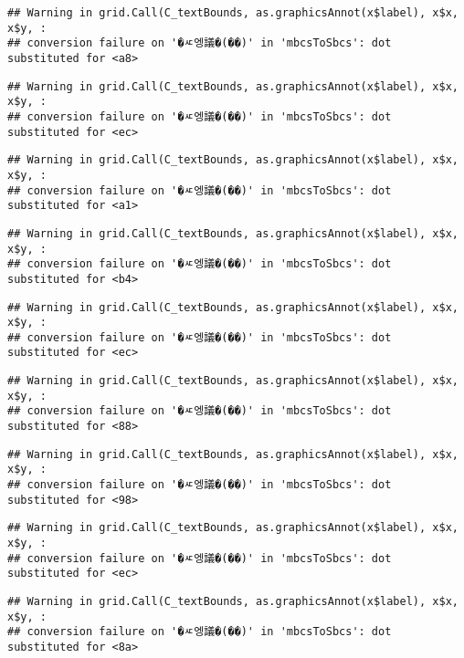 \documentclass[
]{article}
\begin{document}
\begin{verbatim}
## Warning in grid.Call(C_textBounds, as.graphicsAnnot(x$label), x$x, x$y, :
## conversion failure on '�ㅼ엥議�(��)' in 'mbcsToSbcs': dot substituted for <a8>
\end{verbatim}

\begin{verbatim}
## Warning in grid.Call(C_textBounds, as.graphicsAnnot(x$label), x$x, x$y, :
## conversion failure on '�ㅼ엥議�(��)' in 'mbcsToSbcs': dot substituted for <ec>
\end{verbatim}

\begin{verbatim}
## Warning in grid.Call(C_textBounds, as.graphicsAnnot(x$label), x$x, x$y, :
## conversion failure on '�ㅼ엥議�(��)' in 'mbcsToSbcs': dot substituted for <a1>
\end{verbatim}

\begin{verbatim}
## Warning in grid.Call(C_textBounds, as.graphicsAnnot(x$label), x$x, x$y, :
## conversion failure on '�ㅼ엥議�(��)' in 'mbcsToSbcs': dot substituted for <b4>
\end{verbatim}

\begin{verbatim}
## Warning in grid.Call(C_textBounds, as.graphicsAnnot(x$label), x$x, x$y, :
## conversion failure on '�ㅼ엥議�(��)' in 'mbcsToSbcs': dot substituted for <ec>
\end{verbatim}

\begin{verbatim}
## Warning in grid.Call(C_textBounds, as.graphicsAnnot(x$label), x$x, x$y, :
## conversion failure on '�ㅼ엥議�(��)' in 'mbcsToSbcs': dot substituted for <88>
\end{verbatim}

\begin{verbatim}
## Warning in grid.Call(C_textBounds, as.graphicsAnnot(x$label), x$x, x$y, :
## conversion failure on '�ㅼ엥議�(��)' in 'mbcsToSbcs': dot substituted for <98>
\end{verbatim}

\begin{verbatim}
## Warning in grid.Call(C_textBounds, as.graphicsAnnot(x$label), x$x, x$y, :
## conversion failure on '�ㅼ엥議�(��)' in 'mbcsToSbcs': dot substituted for <ec>
\end{verbatim}

\begin{verbatim}
## Warning in grid.Call(C_textBounds, as.graphicsAnnot(x$label), x$x, x$y, :
## conversion failure on '�ㅼ엥議�(��)' in 'mbcsToSbcs': dot substituted for <8a>
\end{verbatim}
\end{document}
